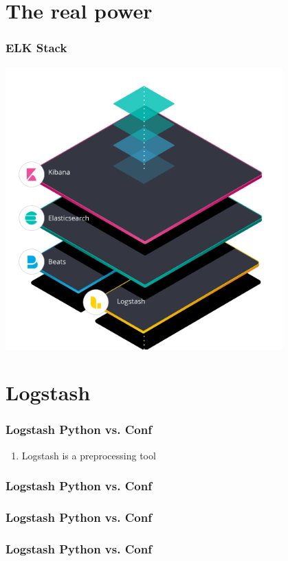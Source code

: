 \documentclass{beamer}
\begin{document}
\section{The real power}
\begin{frame}
  \frametitle{ELK Stack}
    \includegraphics[width=0.8\textwidth]{ELK.png}
\end{frame}

\section{Logstash}
\begin{frame}
  \frametitle{Logstash Python vs. Conf}
  \begin{enumerate}
   \item Logstash is a preprocessing tool 
  \end{enumerate}
  
\end{frame}
\begin{frame}
  \frametitle{Logstash Python vs. Conf}
  
\end{frame}
\begin{frame}
  \frametitle{Logstash Python vs. Conf}
  
\end{frame}
\begin{frame}
  \frametitle{Logstash Python vs. Conf}
  
\end{frame}
\end{document}
